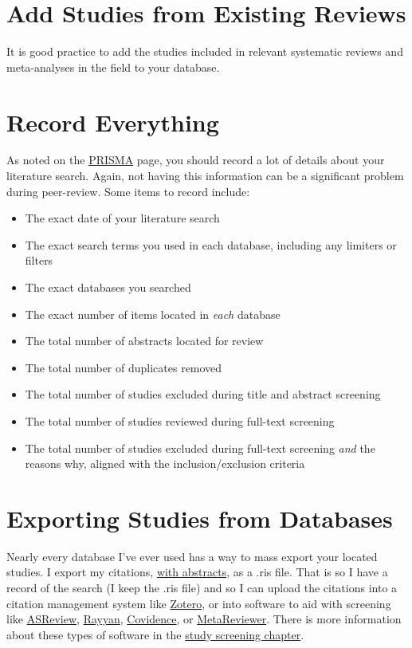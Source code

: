 \documentclass[
]{book}
\begin{document}
\hypertarget{add-studies-from-existing-reviews}{%
\section{Add Studies from Existing Reviews}\label{add-studies-from-existing-reviews}}

It is good practice to add the studies included in relevant systematic reviews and meta-analyses in the field to your database.

\hypertarget{record-everything}{%
\section{Record Everything}\label{record-everything}}

As noted on the \protect\hyperlink{crossPRISMA}{PRISMA} page, you should record a lot of details about your literature search. Again, not having this information can be a significant problem during peer-review. Some items to record include:

\begin{itemize}
\item
  The exact date of your literature search
\item
  The exact search terms you used in each database, including any limiters or filters
\item
  The exact databases you searched
\item
  The exact number of items located in \emph{each} database
\item
  The total number of abstracts located for review
\item
  The total number of duplicates removed
\item
  The total number of studies excluded during title and abstract screening
\item
  The total number of studies reviewed during full-text screening
\item
  The total number of studies excluded during full-text screening \emph{and} the reasons why, aligned with the inclusion/exclusion criteria
\end{itemize}

\hypertarget{exporting-studies-from-databases}{%
\section{Exporting Studies from Databases}\label{exporting-studies-from-databases}}

Nearly every database I've ever used has a way to mass export your located studies. I export my citations, \ul{with abstracts}, as a .ris file. That is so I have a record of the search (I keep the .ris file) and so I can upload the citations into a citation management system like \protect\hyperlink{0}{Zotero}, or into software to aid with screening like \href{https://asreview.nl/}{ASReview}, \href{https://www.rayyan.ai/}{Rayyan}, \href{https://www.covidence.org/}{Covidence}, or \href{https://www.metareviewer.org/}{MetaReviewer}. There is more information about these types of software in the \protect\hyperlink{screening}{study screening chapter}.
\end{document}
